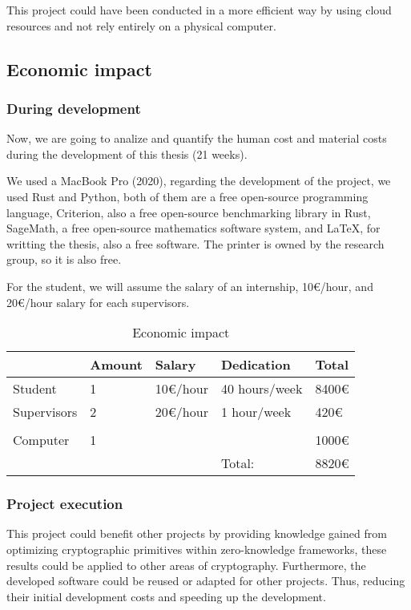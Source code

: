 This project could have been conducted in a more efficient way by using cloud resources and not rely entirely on a physical computer.

\subsection*{Economic impact}
\subsubsection*{During development}
Now, we are going to analize and quantify the human cost and material costs during the development of this thesis (21 weeks).

We used a MacBook Pro (2020), regarding the development of the project, we used Rust and Python, both of them are a free open-source programming language, Criterion, also a free open-source benchmarking library in Rust, SageMath, a free open-source mathematics software system, and LaTeX, for writting the thesis, also a free software. The printer is owned by the research group, so it is also free.

For the student, we will assume the salary of an internship, 10\euro/hour, and 20\euro/hour salary for each supervisors.

\begin{table}[htbp]
    \centering
    \begin{tabular}{lllll}
    \hline
                & Amount & Salary                      & Dedication    & Total                    \\ \hline
    Student     & 1      & 10\euro/hour & 40 hours/week & 8400\euro \\
    Supervisors & 2      & 20\euro/hour & 1 hour/week   & 420\euro  \\
                &        &                             &               &                          \\
    Computer    & 1      &                             &               & 1000\euro \\ \hline
                &        &                             & Total:        & 8820\euro \\ \hline
    \end{tabular}
    \caption{Economic impact}
    \label{tab:economic-impact}
    \end{table}

\subsubsection*{Project execution}
This project could benefit other projects by providing knowledge gained from optimizing cryptographic primitives within zero-knowledge frameworks, these results could be applied to other areas of cryptography. Furthermore, the developed software could be reused or adapted for other projects. Thus, reducing their initial development costs and speeding up the development.

